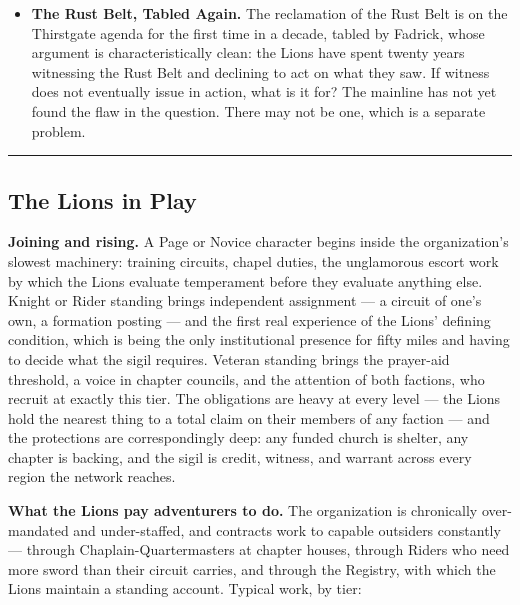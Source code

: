 \begin{itemize}
    \item \textbf{The Rust Belt, Tabled Again.} The reclamation of the Rust Belt is on the Thirstgate agenda for the first time in a decade, tabled by Fadrick, whose argument is characteristically clean: the Lions have spent twenty years witnessing the Rust Belt and declining to act on what they saw. If witness does not eventually issue in action, what is it for? The mainline has not yet found the flaw in the question. There may not be one, which is a separate problem.
\end{itemize}

\medskip\hrule\medskip

\subsection{The Lions in Play}

\textbf{Joining and rising.} A Page or Novice character begins inside the organization's slowest machinery: training circuits, chapel duties, the unglamorous escort work by which the Lions evaluate temperament before they evaluate anything else. Knight or Rider standing brings independent assignment --- a circuit of one's own, a formation posting --- and the first real experience of the Lions' defining condition, which is being the only institutional presence for fifty miles and having to decide what the sigil requires. Veteran standing brings the prayer-aid threshold, a voice in chapter councils, and the attention of both factions, who recruit at exactly this tier. The obligations are heavy at every level --- the Lions hold the nearest thing to a total claim on their members of any faction --- and the protections are correspondingly deep: any funded church is shelter, any chapter is backing, and the sigil is credit, witness, and warrant across every region the network reaches.

\textbf{What the Lions pay adventurers to do.} The organization is chronically over-mandated and under-staffed, and contracts work to capable outsiders constantly --- through Chaplain-Quartermasters at chapter houses, through Riders who need more sword than their circuit carries, and through the Registry, with which the Lions maintain a standing account. Typical work, by tier:

